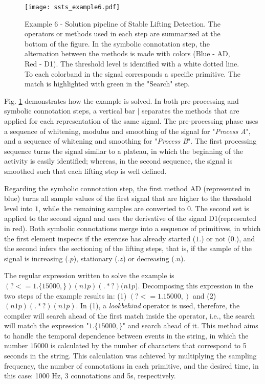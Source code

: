 \begin{figure}[H]
  \centering
      \texttt{[image: ssts\_example6.pdf]}
  \caption{Example 6 - Solution pipeline of Stable Lifting Detection. The operators or methods used in each step are summarized at the bottom of the figure. In the symbolic connotation step, the alternation between the methods is made with colors (Blue - AD, Red - D1). The threshold level is identified with a white dotted line. To each colorband in the signal corresponds a specific primitive. The match is highlighted with green in the "Search" step.}
  \label{fig:Hard}
\end{figure}

Fig. \ref{fig:Hard} demonstrates how the example is solved. In both pre-processing and symbolic connotation steps, a vertical bar $|$ separates the methods that are applied for each representation of the same signal. The pre-processing phase uses a sequence of whitening, modulus and smoothing of the signal for "\textit{Process A}", and a sequence of whitening and smoothing for "\textit{Process B}". The first processing sequence turns the signal similar to a plateau, in which the beginning of the activity is easily identified; whereas, in the second sequence, the signal is smoothed such that each lifting step is well defined.
\par
Regarding the symbolic connotation step, the first method AD (represented in blue) turns all sample values of the first signal that are higher to the threshold level into $1$, while the remaining samples are converted to $0$. The second set is applied to the second signal and uses the derivative of the signal D1(represented in red). Both symbolic connotations merge into a sequence of primitives, in which the first element inspects if the exercise has already started ($1.$)  or not ($0.$), and the second infers the sectioning of the lifting steps, that is, if the sample of the signal is increasing ($.p$), stationary ($.z$) or decreasing ($.n$).
\par
The regular expression written to solve the example is $(?<=1.\{15000,\})(n1p)(.*?)(n1p$). Decomposing this expression in the two steps of the example results in: (1) $(?<=1.{15000,})$ and (2)$(n1p)(.*?)(n1p)$. In (1), a \textit{lookbehind} operator is used, therefore, the compiler will search ahead of the first match inside the operator, i.e., the search will match the expression "$1.\{15000,\}$" and search ahead of it. This method aims to handle the temporal dependence between events in the string, in which the number $15000$ is calculated by the number of characters that correspond to 5 seconds in the string. This calculation was achieved by multiplying the sampling frequency, the number of connotations in each primitive, and the desired time, in this case: 1000 Hz, 3 connotations and 5s, respectively.

